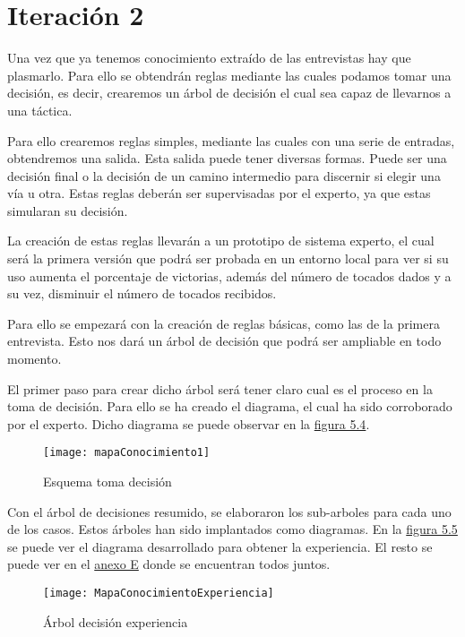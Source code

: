 \section{Iteración 2}

Una vez que ya tenemos conocimiento extraído de las entrevistas hay que plasmarlo.
Para ello se obtendrán reglas mediante las cuales podamos tomar una decisión, es decir,
crearemos un árbol de decisión el cual sea capaz de llevarnos a una táctica.

Para ello crearemos reglas simples, mediante las cuales con una serie de entradas,
obtendremos una salida. Esta salida puede tener diversas formas. Puede ser una decisión final
o la decisión de un camino intermedio para discernir si elegir una vía u otra.
Estas reglas deberán ser supervisadas por el experto, ya que estas simularan su decisión.

La creación de estas reglas llevarán a un prototipo de sistema experto, el cual será
la primera versión que podrá ser probada en un entorno local para ver si su uso aumenta
el porcentaje de victorias, además del número de tocados dados y a su vez, disminuir el
número de tocados recibidos.

Para ello se empezará con la creación de reglas básicas, como las de la primera entrevista. Esto
nos dará un árbol de decisión que podrá ser ampliable en todo momento.

El primer paso para crear dicho árbol será tener claro cual es el proceso en la toma de decisión.
Para ello se ha creado el diagrama, el cual ha sido corroborado por el experto. Dicho diagrama
se puede observar en la \hyperref[fig:Esquema toma decisión]{figura 5.4}.

\begin{figure}[htb]
  \centering
    \texttt{[image: mapaConocimiento1]}
  \caption[Esquema toma decisión]{Esquema toma decisión}
  \label{fig:Esquema toma decisión}
\end{figure}


Con el árbol de decisiones resumido, se elaboraron los sub-arboles para cada uno de los casos.
Estos árboles han sido implantados como diagramas. En la \hyperref[fig:Arbol decisión experiencia]{figura 5.5} se puede ver el diagrama
desarrollado para obtener la experiencia. El resto se puede ver en el \hyperref[cap:Diagramas mapas conocimiento]{anexo E} donde se encuentran
todos juntos.

\begin{figure}[htb]
  \centering
    \texttt{[image: MapaConocimientoExperiencia]}
  \caption[Árbol decisión experiencia]{Árbol decisión experiencia}
  \label{fig:Arbol decisión experiencia}
\end{figure}

